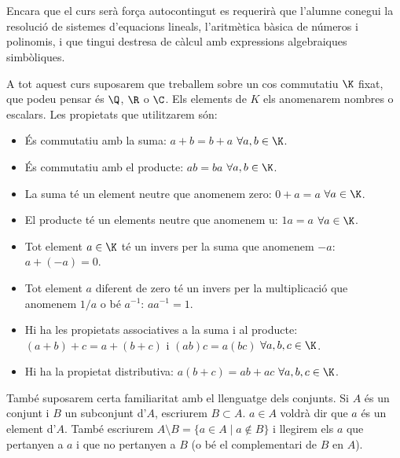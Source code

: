 \section*{}
Encara que el curs serà força autocontingut es requerirà que l'alumne conegui la resolució de sistemes d'equacions lineals, l'aritmètica bàsica de números i polinomis, i que tingui destresa de càlcul amb expressions algebraiques simbòliques.

A tot aquest curs suposarem que treballem sobre un cos commutatiu $\K$ fixat, que podeu pensar és $\Q$, $\R$ o $\C$. Els elements de $K$ els anomenarem nombres o escalars. Les propietats que utilitzarem són:
\begin{itemize}
	\item És commutatiu amb la suma: $a+b=b+a$ $\forall a,b\in \K$.
	\item És commutatiu amb el producte: $ab=ba$ $\forall a,b\in \K$.
	\item La suma té un element neutre que anomenem zero: $0+a=a$ $\forall a\in\K$.
	\item El producte té un elements neutre que anomenem u: $1a=a$ $\forall a\in\K$.
	\item Tot element $a\in\K$ té un invers per la suma que anomenem $-a$: $a+(-a)=0$.
	\item Tot element $a$ diferent de zero té un invers per la multiplicació que anomenem $1/a$ o bé $a^{-1}$: $a a^{-1}=1$.
	\item Hi ha les propietats associatives a la suma i al producte: $(a+b)+c=a+(b+c)$ i $(ab)c=a(bc)$ $\forall a,b,c \in \K$.
	\item Hi ha la propietat distributiva: $a(b+c)=ab+ac$ $\forall a,b,c \in \K$.
\end{itemize}

També suposarem certa familiaritat amb el llenguatge dels conjunts. Si $A$ és un conjunt i $B$ un subconjunt d'$A$, escriurem $B\subset A$. $a\in A$ voldrà dir que $a$ és un element d'$A$. També escriurem $A\setminus B=\{a \in A \mid a \not\in B\}$ i llegirem els $a$ que pertanyen a $a$ i que no pertanyen a $B$ (o bé el complementari de $B$ en $A$). 
